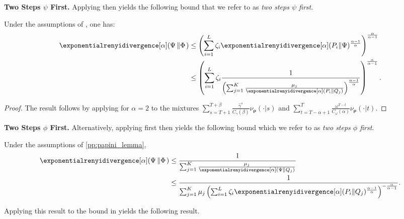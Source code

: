 \textbf{Two Steps $\psi$ First.}
\label{subsubsec:two_steps_psi_first}
Applying  then  yields the following bound that we refer to as \textit{two steps $\psi$ first}. 

\begin{prop}
\label{pp:var_bound_2_steps_psi_first}
    Under the assumptions of , one has:
    \begin{align*}
        \exponentialrenyidivergence[\alpha](\Psi\left\Vert \Phi\right.) 
        &\leq 
        \left(\sum_{i=1}^L \zeta_i \exponentialrenyidivergence[\alpha](P_i\Vert \Psi)^{\frac{\alpha-1}{\alpha}}\right)^{\frac{\alpha}{\alpha-1}}\\
        &\leq 
        \left(\sum_{i=1}^L \zeta_i \frac{1}{\left(\sum_{j=1}^K\frac{\mu_j}{\exponentialrenyidivergence[\alpha]( P_i \Vert Q_j)}\right)^{\frac{\alpha-1}{\alpha}}}\right)^{\frac{\alpha}{\alpha-1}}.
    \end{align*}
\end{prop}


\renyidivergencebound*
\begin{proof}
    The result follows by applying  for $\alpha=2$ to the mixtures $\textstyle\sum_{s=T+1}^{T+\beta} \frac{\widehat{\gamma}^s}{C_\gamma(\beta)} \nu_{\boldsymbol\rho}(\cdot|s)$ and $\textstyle\sum_{t=T-\alpha+1}^{T} \frac{\omega^{T-t} }{C_\omega(\alpha)}\nu_{\boldsymbol\rho}(\cdot|t)$.
\end{proof}



\textbf{Two Steps $\phi$ First.}
Alternatively, applying  first then  yields the following bound which we refer to as \textit{two steps $\phi$ first}.

\begin{prop}
    Under the assumptions of \cref{pp:papini_lemma},
    \begin{align*}
    \exponentialrenyidivergence[\alpha](\Psi\left\Vert \Phi\right.)
    &\leq \frac{1}{\sum_{j=1}^K \frac{\mu_j}{\exponentialrenyidivergence[\alpha](\Psi\Vert Q_j)}}
    \\
    &\leq \frac{1}{\sum_{j=1}^K \mu_j \left(\sum_{i=1}^L \zeta_i \exponentialrenyidivergence[\alpha](P_i\Vert Q_j)^{\frac{\alpha-1}{\alpha}}\right)^{-\frac{\alpha}{\alpha-1}} }.
\end{align*}
\end{prop}

Applying this result to the bound in  yields the following result.

